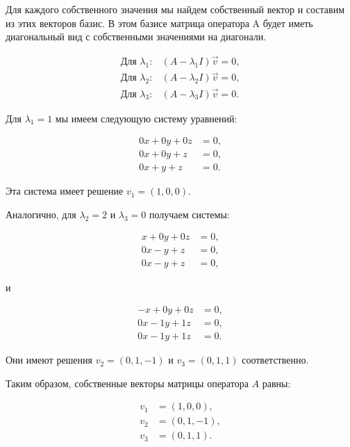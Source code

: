 \documentclass[12pt]{article}
\begin{document}
\begin{minipage}{0.45\textwidth}
Для каждого собственного значения мы найдем собственный вектор и составим из этих векторов базис. В этом базисе матрица оператора A будет иметь диагональный вид с собственными значениями на диагонали.

\begin{align*}
\text{Для } \lambda_1 : &(A - \lambda_1 I)\vec{v} = 0, \\
\text{Для } \lambda_2 : &(A - \lambda_2 I)\vec{v} = 0, \\
\text{Для } \lambda_3 : &(A - \lambda_3 I)\vec{v} = 0.
\end{align*}

Для $\lambda_1 = 1$ мы имеем следующую систему уравнений:

\begin{align*}
0x + 0y + 0z &= 0, \\
0x + 0y + z &= 0, \\
0x + y + z &= 0.
\end{align*}

Эта система имеет решение $v_1 = (1, 0, 0)$.
\end{minipage}
\hfill
\begin{minipage}{0.45\textwidth}
Аналогично, для $\lambda_2 = 2$ и $\lambda_3 = 0$ получаем системы:

\begin{align*}
x + 0y + 0z &= 0, \\
0x - y + z &= 0, \\
0x - y + z &= 0,
\end{align*}

и 

\begin{align*}
-x + 0y + 0z &= 0, \\
0x - 1y + 1z &= 0, \\
0x - 1y + 1z &= 0.
\end{align*}

Они имеют решения $v_2 = (0, 1, -1)$ и $v_3 = (0, 1, 1)$ соответственно.

Таким образом, собственные векторы матрицы оператора $A$ равны:

\begin{align*}
v_1 &= (1, 0, 0), \\
v_2 &= (0, 1, -1), \\
v_3 &= (0, 1, 1).
\end{align*}
\end{minipage}

\vspace{1cm}
\end{document}
